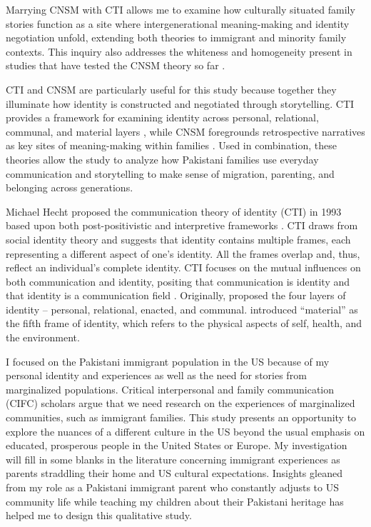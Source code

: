 Marrying CNSM with CTI allows me to examine how culturally situated family stories function as a site where intergenerational meaning-making and identity negotiation unfold, extending both theories to immigrant and minority family contexts. This inquiry also addresses the whiteness and homogeneity present in studies that have tested the CNSM theory so far \citep{koenigkellasCommunicatedNarrativeSenseMaking2022}.

CTI and CNSM are particularly useful for this study because together they illuminate how identity is constructed and negotiated through storytelling. CTI provides a framework for examining identity across personal, relational, communal, and material layers \citep{kuiperCommunicationTheoryIdentity2021, hecht2002ResearchOdyssey1993, hechtCommunicationTheoryIdentity2021}, while CNSM foregrounds retrospective narratives as key sites of meaning-making within families \citep{koenigkellasCommunicatedNarrativeSenseMaking2022}. Used in combination, these theories allow the study to analyze how Pakistani families use everyday communication and storytelling to make sense of migration, parenting, and belonging across generations. 

Michael Hecht proposed the communication theory of identity (CTI) in 1993 based upon both post-positivistic and interpretive frameworks \citep{hecht2002ResearchOdyssey1993, shinCommunicationTheoryIdentity2017}. CTI draws from social identity theory and suggests that identity contains multiple frames, each representing a different aspect of one’s identity. All the frames overlap and, thus, reflect an individual's complete identity. CTI focuses on the mutual influences on both communication and identity, positing that communication is identity and that identity is a communication field \citep{hechtCommunicationTheoryIdentity2021, jungElaboratingCommunicationTheory2004, shinCommunicationTheoryIdentity2017}. Originally, \citet{hecht2002ResearchOdyssey1993} proposed the four layers of identity – personal, relational, enacted, and communal. \citet{kuiperCommunicationTheoryIdentity2021} introduced “material” as the fifth frame of identity, which refers to the physical aspects of self, health, and the environment. 

I focused on the Pakistani immigrant population in the US because of my personal identity and experiences as well as the need for stories from marginalized populations. Critical interpersonal and family communication (CIFC) scholars argue that we need research on the experiences of marginalized communities, such as immigrant families. This study presents an opportunity to explore the nuances of a different culture in the US beyond the usual emphasis on educated, prosperous people in the United States or Europe. My investigation will fill in some blanks in the literature concerning immigrant experiences as parents straddling their home and US cultural expectations. 
Insights gleaned from my role as a Pakistani immigrant parent who constantly adjusts to US community life while teaching my children about their Pakistani heritage has helped me to design this qualitative study.

